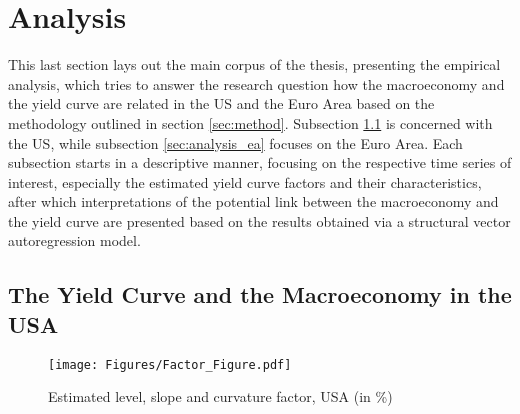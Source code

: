 \section{Analysis}
\label{sec:analysis}

This last section lays out the main corpus of the thesis, presenting the empirical analysis, which tries to answer the research question how the macroeconomy and the yield curve are related in the US and the Euro Area based on the methodology outlined in section \ref{sec:method}. Subsection \ref{sec:analysis_us} is concerned with the US, while subsection \ref{sec:analysis_ea} focuses on the Euro Area. Each subsection starts in a descriptive manner, focusing on the respective time series of interest, especially the estimated yield curve factors and their characteristics, after which interpretations of the potential link between the macroeconomy and the yield curve are presented based on the results obtained via a structural vector autoregression model. 

\subsection{The Yield Curve and the Macroeconomy in the USA}
\label{sec:analysis_us}

\begin{figure}[!t]
    \centering
    \texttt{[image: Figures/Factor\_Figure.pdf]}
    \caption{Estimated level, slope and curvature factor, USA (in \%)}
    \label{fig:factors_us}
\end{figure}

